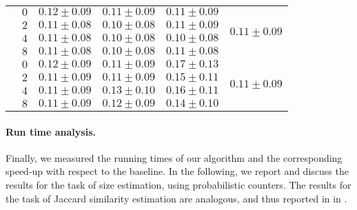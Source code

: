 \begin{table}[h]
\begin{tabular}{lc|ccc|c}
        \midrule[.66pt]

        \parbox[t]{2mm}{}

        & $0$ & $0.12 \pm 0.09$ & $0.11 \pm 0.09$ & $0.11 \pm 0.09$ &  \\
        & $2$ & $0.11 \pm 0.08$ & $0.10 \pm 0.08$ & $0.11 \pm 0.09$ & \\
        & $4$ & $0.11 \pm 0.08$ & $0.10 \pm 0.08$ & $0.10 \pm 0.08$ & \\
        & $8$ & $0.11 \pm 0.08$ & $0.10 \pm 0.08$ & $0.11 \pm 0.08$ & \\

        \midrule[.66pt]

        \parbox[t]{2mm}{}

        & $0$ & $0.12 \pm 0.09$ & $0.11 \pm 0.09$ & $0.17 \pm 0.13$ &  \\
        & $2$ & $0.11 \pm 0.09$ & $0.11 \pm 0.09$ & $0.15 \pm 0.11$ & \\
        & $4$ & $0.11 \pm 0.09$ & $0.13 \pm 0.10$ & $0.16 \pm 0.11$ & \\
        & $8$ & $0.11 \pm 0.09$ & $0.12 \pm 0.09$ & $0.14 \pm 0.10$ & \\

    \bottomrule

    \end{tabular}
    \label{tab:jacc-similarity-quality}
\end{table}

\paragraph{Run time analysis.}
Finally, we measured the running times of our algorithm and the corresponding speed-up with respect to the baseline.
In the following, we report and discuss the results for the task of size estimation, using probabilistic counters. The results for the task of Jaccard similarity estimation are analogous, and thus reported in  in .

